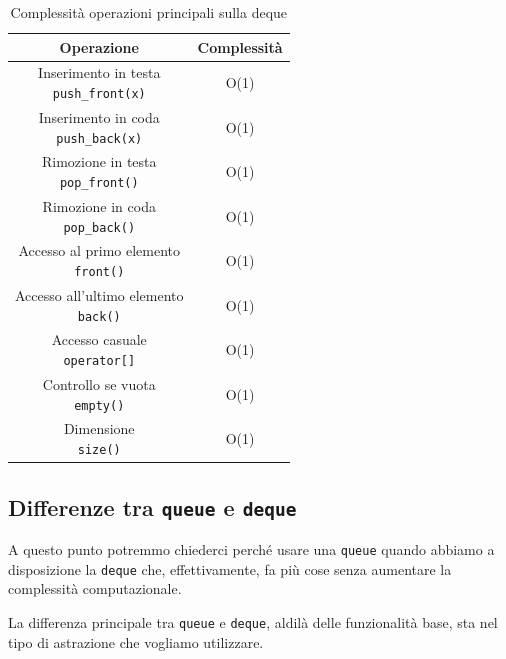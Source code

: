 \begin{table}[h!]
	\centering
	\renewcommand{\arraystretch}{1.5}
	\setlength{\tabcolsep}{12pt}
	\begin{tabular}{|c|c|}
		\hline
		\textbf{Operazione} & \textbf{Complessità} \\
		\hline
		\makecell{Inserimento in testa \\ \texttt{push\_front(x)}} & O(1) \\
		\hline
		\makecell{Inserimento in coda \\ \texttt{push\_back(x)}} & O(1) \\
		\hline
		\makecell{Rimozione in testa \\ \texttt{pop\_front()}} & O(1) \\
		\hline
		\makecell{Rimozione in coda \\ \texttt{pop\_back()}} & O(1) \\
		\hline
		\makecell{Accesso al primo elemento \\ \texttt{front()}} & O(1) \\
		\hline
		\makecell{Accesso all'ultimo elemento \\ \texttt{back()}} & O(1) \\
		\hline
		\makecell{Accesso casuale \\ \texttt{operator[]}} & O(1) \\
		\hline
		\makecell{Controllo se vuota \\ \texttt{empty()}} & O(1) \\
		\hline
		\makecell{Dimensione \\ \texttt{size()}} & O(1) \\
		\hline
	\end{tabular}
	\caption{Complessità operazioni principali sulla deque}
	\label{tab:strutture-dati:deque:complessita}
\end{table}

\subsection{Differenze tra \texttt{queue} e \texttt{deque}}

A questo punto potremmo chiederci perché usare una \texttt{queue} quando abbiamo a disposizione la \texttt{deque} che, effettivamente, fa più cose senza aumentare la complessità computazionale.

La differenza principale tra \texttt{queue} e \texttt{deque}, aldilà delle funzionalità base, sta nel tipo di astrazione che vogliamo utilizzare.

